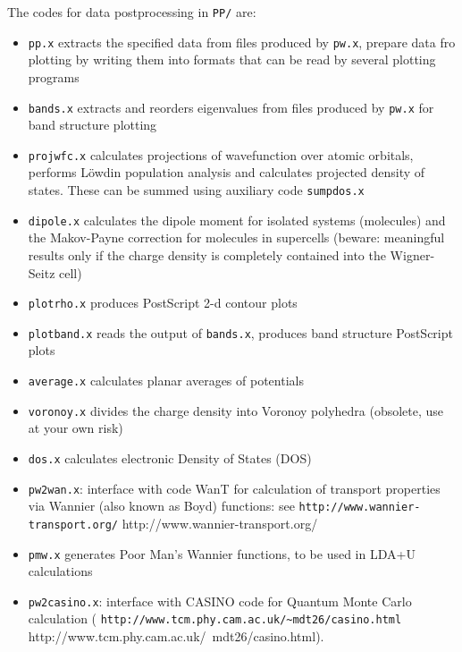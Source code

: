 \documentclass[12pt,a4paper]{article}
\begin{document}
The codes for data postprocessing in \texttt{PP/} are:
\begin{itemize}
  \item \texttt{pp.x} extracts the specified data from files
        produced by \texttt{pw.x}, prepare data fro plotting
        by writing them into formats that can be read by
        several plotting programs
  \item \texttt{bands.x} extracts and reorders eigenvalues
        from files produced by \texttt{pw.x} for band structure plotting
  \item \texttt{projwfc.x} calculates projections of wavefunction
        over atomic orbitals, performs L\"owdin population
        analysis and calculates projected density of states. 
        These can be summed using auxiliary code \texttt{sumpdos.x}
  \item \texttt{dipole.x} calculates the dipole moment for
        isolated systems (molecules) and the Makov-Payne correction
        for molecules in supercells (beware: meaningful results 
        only if the charge density is completely contained into 
        the Wigner-Seitz cell)
  \item \texttt{plotrho.x} produces PostScript 2-d contour plots
  \item \texttt{plotband.x} reads the output of \texttt{bands.x},
        produces band structure PostScript plots
  \item \texttt{average.x} calculates planar averages of
        potentials
  \item \texttt{voronoy.x} divides the charge density into Voronoy
        polyhedra (obsolete, use at your own risk)
  \item \texttt{dos.x} calculates electronic Density of States
        (DOS)
  \item \texttt{pw2wan.x}: interface with code WanT for calculation
        of transport properties via Wannier (also known as Boyd)
        functions: see\hfill\break
        \htmladdnormallink%
        {\texttt{http://www.wannier-transport.org/}}%
        {http://www.wannier-transport.org/}
  \item \texttt{pmw.x} generates Poor Man's Wannier functions,
        to be used in LDA+U calculations
  \item \texttt{pw2casino.x}: interface with CASINO code for Quantum
        Monte Carlo calculation
        (\htmladdnormallink%
         {\texttt{http://www.tcm.phy.cam.ac.uk/\~{}mdt26/casino.html}}%
         {http://www.tcm.phy.cam.ac.uk/~mdt26/casino.html}).
\end{itemize}
\end{document}
